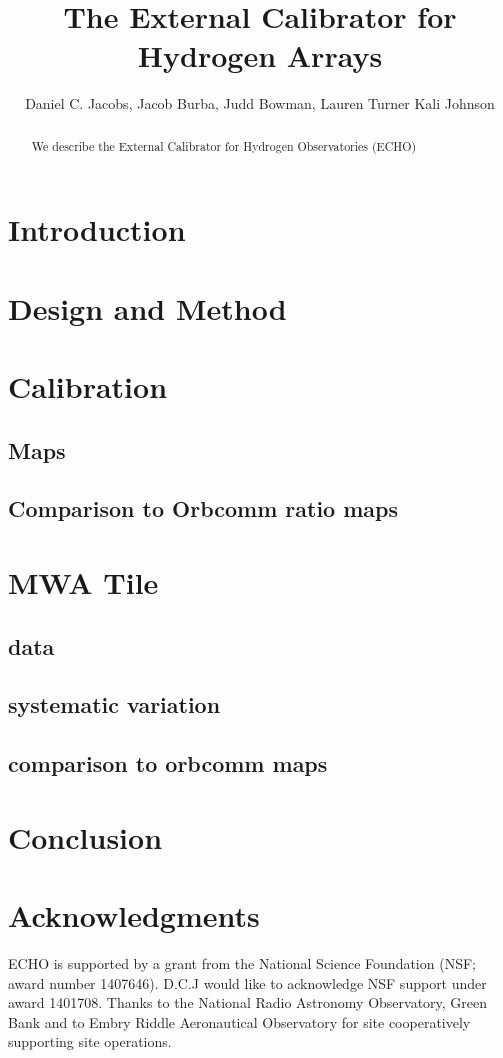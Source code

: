 \documentclass[preprint2]{aastex}
\begin{document}
\title{The External Calibrator for Hydrogen Arrays}
\author{
Daniel C. Jacobs,
Jacob Burba,
Judd Bowman,
Lauren Turner
Kali Johnson}



\begin{abstract}
We describe the External Calibrator for Hydrogen Observatories (ECHO) 
\end{abstract}



\section{Introduction}\label{sec:intro}

\section{Design and Method}
\section{Calibration}
\subsection{Maps}
\subsection{Comparison to Orbcomm ratio maps}
\section{MWA Tile}
\subsection{data}
\subsection{systematic variation}
\subsection{comparison to orbcomm maps}
\section{Conclusion}


\section{Acknowledgments}{

ECHO is supported by a grant from the National Science Foundation (NSF; award number 1407646). D.C.J would like to acknowledge NSF support  under award 1401708.
Thanks to the National Radio Astronomy Observatory, Green Bank and to Embry Riddle Aeronautical Observatory for site cooperatively supporting site operations.
}


\end{document}
